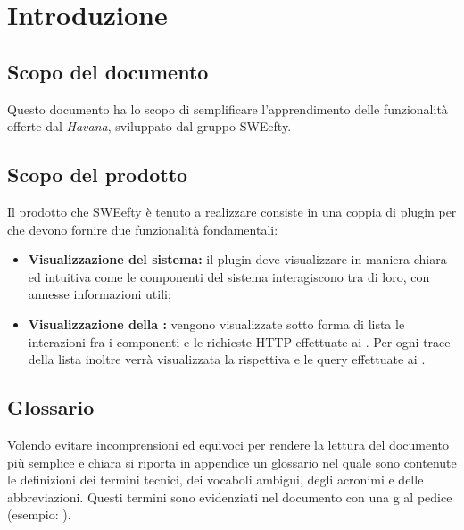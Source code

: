 \section{Introduzione}
\label{sec:intro}
	\subsection{Scopo del documento}
	Questo documento ha lo scopo di semplificare l'apprendimento delle funzionalità offerte dal  \emph{Havana},  sviluppato dal gruppo SWEefty.
	
	\subsection{Scopo del prodotto}
	Il prodotto che SWEefty è tenuto a realizzare consiste in una coppia di plugin per  che devono fornire due funzionalità fondamentali:
	\begin{itemize}
		\item \textbf{Visualizzazione  del sistema:} il plugin deve visualizzare in maniera chiara ed intuitiva come le componenti del sistema interagiscono tra di loro, con annesse informazioni utili;
		\item \textbf{Visualizzazione della :} vengono visualizzate sotto forma di lista le interazioni fra i componenti e le richieste HTTP effettuate ai . Per ogni trace della lista inoltre verrà visualizzata la rispettiva  e le query effettuate ai .
	\end{itemize}

	\subsection{Glossario}
	Volendo evitare incomprensioni ed equivoci per rendere la lettura del documento più semplice
	e chiara si riporta in appendice un glossario nel quale sono contenute le definizioni dei
	termini tecnici, dei vocaboli ambigui, degli acronimi e delle abbreviazioni. Questi termini
	sono evidenziati nel documento con una g al pedice (esempio: ).